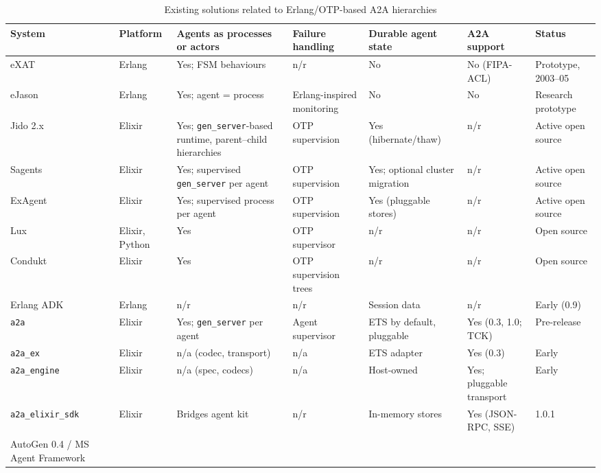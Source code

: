 \documentclass[conference,letterpaper]{IEEEtran}
\newcommand{\code}[1]{\texttt{#1}}
\newcommand{\gs}{\code{gen\_server}}
\begin{document}
\begin{table}[!h]
\centering
\caption{Existing solutions related to Erlang/OTP-based A2A hierarchies}
\label{tab:matrix}
\footnotesize
\renewcommand{\arraystretch}{1.12}
\begin{tabularx}{\textwidth}{@{}P{2.9cm}P{1.6cm}YYYP{2.3cm}P{1.9cm}@{}}
\toprule
\textbf{System} & \textbf{Platform} & \textbf{Agents as processes or actors}
 & \textbf{Failure handling} & \textbf{Durable agent state}
 & \textbf{A2A support} & \textbf{Status} \\
\midrule
eXAT~\cite{distefano2003,distefano2004} & Erlang & Yes; FSM behaviours
 & n/r & No & No (FIPA-ACL) & Prototype, 2003--05 \\
eJason~\cite{fernandez2013,benacearle2017} & Erlang & Yes; agent = process
 & Erlang-inspired monitoring & No & No & Research prototype \\
Jido 2.x~\cite{jido,jido-storage} & Elixir & Yes; \gs-based runtime,
 parent--child hierarchies & OTP supervision & Yes (hibernate/thaw) & n/r
 & Active open source \\
Sagents~\cite{sagents,sagents-readme} & Elixir & Yes; supervised \gs{}
 per agent & OTP supervision & Yes; optional cluster migration & n/r
 & Active open source \\
ExAgent~\cite{exagent} & Elixir & Yes; supervised process per agent
 & OTP supervision & Yes (pluggable stores) & n/r & Active open source \\
Lux~\cite{lux} & Elixir, Python & Yes & OTP supervisor & n/r & n/r
 & Open source \\
Condukt~\cite{condukt} & Elixir & Yes & OTP supervision trees & n/r & n/r
 & Open source \\
Erlang ADK~\cite{erlang-adk} & Erlang & n/r & n/r & Session data & n/r
 & Early (0.9) \\
\code{a2a}~\cite{a2a-actioncard} & Elixir & Yes; \gs{} per agent
 & Agent supervisor & ETS by default, pluggable & Yes (0.3, 1.0; TCK)
 & Pre-release \\
\code{a2a\_ex}~\cite{a2a-ex} & Elixir & n/a (codec, transport) & n/a
 & ETS adapter & Yes (0.3) & Early \\
\code{a2a\_engine}~\cite{a2a-engine} & Elixir & n/a (spec, codecs)
 & n/a & Host-owned & Yes; pluggable transport & Early \\
\code{a2a\_elixir\_sdk}~\cite{a2a-elixir-sdk} & Elixir & Bridges agent kit
 & n/r & In-memory stores & Yes (JSON-RPC, SSE) & 1.0.1 \\
AutoGen 0.4 / MS Agent Framework~\cite{autogen2025,maf-sdtimes,maf-vsm}

\end{tabularx}
\end{table}
\end{document}
